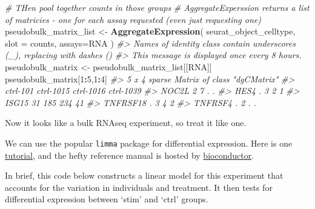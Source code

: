 \documentclass[
]{book}
\newenvironment{Shaded}{\begin{snugshade}}{\end{snugshade}}
\newcommand{\AttributeTok}[1]{\textcolor[rgb]{0.13,0.29,0.53}{#1}}
\newcommand{\CommentTok}[1]{\textcolor[rgb]{0.56,0.35,0.01}{\textit{#1}}}
\newcommand{\DecValTok}[1]{\textcolor[rgb]{0.00,0.00,0.81}{#1}}
\newcommand{\FunctionTok}[1]{\textcolor[rgb]{0.13,0.29,0.53}{\textbf{#1}}}
\newcommand{\NormalTok}[1]{#1}
\newcommand{\OtherTok}[1]{\textcolor[rgb]{0.56,0.35,0.01}{#1}}
\newcommand{\SpecialCharTok}[1]{\textcolor[rgb]{0.81,0.36,0.00}{\textbf{#1}}}
\newcommand{\StringTok}[1]{\textcolor[rgb]{0.31,0.60,0.02}{#1}}
\begin{document}
\begin{Shaded}
\begin{Highlighting}[]
\CommentTok{\# THen pool together counts in those groups}
\CommentTok{\# AggregateExperssion returns a list of matricies {-} one for each assay requested (even just requesting one)}
\NormalTok{pseudobulk\_matrix\_list }\OtherTok{\textless{}{-}} \FunctionTok{AggregateExpression}\NormalTok{( seurat\_object\_celltype,  }\AttributeTok{slot =} \StringTok{\textquotesingle{}counts\textquotesingle{}}\NormalTok{, }\AttributeTok{assays=}\StringTok{\textquotesingle{}RNA\textquotesingle{}}\NormalTok{ )}
\CommentTok{\#\textgreater{} Names of identity class contain underscores (\textquotesingle{}\_\textquotesingle{}), replacing with dashes (\textquotesingle{}{-}\textquotesingle{})}
\CommentTok{\#\textgreater{} This message is displayed once every 8 hours.}
\NormalTok{pseudobulk\_matrix      }\OtherTok{\textless{}{-}}\NormalTok{ pseudobulk\_matrix\_list[[}\StringTok{\textquotesingle{}RNA\textquotesingle{}}\NormalTok{]]}
\NormalTok{pseudobulk\_matrix[}\DecValTok{1}\SpecialCharTok{:}\DecValTok{5}\NormalTok{,}\DecValTok{1}\SpecialCharTok{:}\DecValTok{4}\NormalTok{]}
\CommentTok{\#\textgreater{} 5 x 4 sparse Matrix of class "dgCMatrix"}
\CommentTok{\#\textgreater{}          ctrl{-}101 ctrl{-}1015 ctrl{-}1016 ctrl{-}1039}
\CommentTok{\#\textgreater{} NOC2L           2         7         .         .}
\CommentTok{\#\textgreater{} HES4            .         3         2         1}
\CommentTok{\#\textgreater{} ISG15          31       185       234        41}
\CommentTok{\#\textgreater{} TNFRSF18        .         3         4         2}
\CommentTok{\#\textgreater{} TNFRSF4         .         2         .         .}
\end{Highlighting}
\end{Shaded}

Now it looks like a bulk RNAseq experiment, so treat it like one.

We can use the popular \texttt{limma} package for differential expression. Here is one \href{https://ucdavis-bioinformatics-training.github.io/2018-June-RNA-Seq-Workshop/thursday/DE.html}{tutorial}, and the hefty reference manual is hosted by \href{https://bioconductor.org/packages/release/bioc/html/limma.html}{bioconductor}.

In brief, this code below constructs a linear model for this experiment that accounts for the variation in individuals and treatment. It then tests for differential expression between `stim' and `ctrl' groups.
\end{document}
